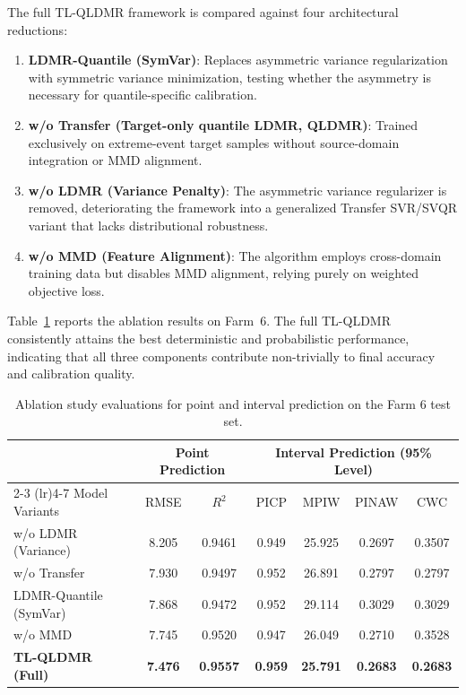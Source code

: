 \documentclass[a4paper]{cas-sc}
\begin{document}
The full TL-QLDMR framework is compared against four architectural reductions:
\begin{enumerate}
    \item \textbf{LDMR-Quantile (SymVar)}: Replaces asymmetric variance regularization with symmetric variance minimization, testing whether the asymmetry is necessary for quantile-specific calibration.
    \item \textbf{w/o Transfer (Target-only quantile LDMR, QLDMR)}: Trained exclusively on extreme-event target samples without source-domain integration or MMD alignment.
    \item \textbf{w/o LDMR (Variance Penalty)}: The asymmetric variance regularizer is removed, deteriorating the framework into a generalized Transfer SVR/SVQR variant that lacks distributional robustness.
    \item \textbf{w/o MMD (Feature Alignment)}: The algorithm employs cross-domain training data but disables MMD alignment, relying purely on weighted objective loss.
\end{enumerate}

Table~\ref{tab:ablation_results} reports the ablation results on Farm~6. The full TL-QLDMR consistently attains the best deterministic and probabilistic performance, indicating that all three components contribute non-trivially to final accuracy and calibration quality.

\begin{table}[ht]
\centering
\caption{Ablation study evaluations for point and interval prediction on the Farm 6 test set.}
\setlength{\tabcolsep}{3mm}
\begin{tabular}{lcccccc}
\toprule
& \multicolumn{2}{c}{Point Prediction} & \multicolumn{4}{c}{Interval Prediction (95\% Level)} \\
\cmidrule(lr){2-3} \cmidrule(lr){4-7}
Model Variants & RMSE & $R^2$ & PICP & MPIW & PINAW & CWC \\
\midrule
w/o LDMR (Variance)     & 8.205 & 0.9461 & 0.949 & 25.925 & 0.2697 & 0.3507 \\
w/o Transfer            & 7.930 & 0.9497 & 0.952 & 26.891 & 0.2797 & 0.2797 \\
LDMR-Quantile (SymVar)  & 7.868 & 0.9472 & 0.952 & 29.114 & 0.3029 & 0.3029 \\
w/o MMD                 & 7.745 & 0.9520 & 0.947 & 26.049 & 0.2710 & 0.3528 \\
\textbf{TL-QLDMR (Full)} & \textbf{7.476} & \textbf{0.9557} & \textbf{0.959} & \textbf{25.791} & \textbf{0.2683} & \textbf{0.2683} \\
\bottomrule
\end{tabular}
\label{tab:ablation_results}
\end{table}
\end{document}

